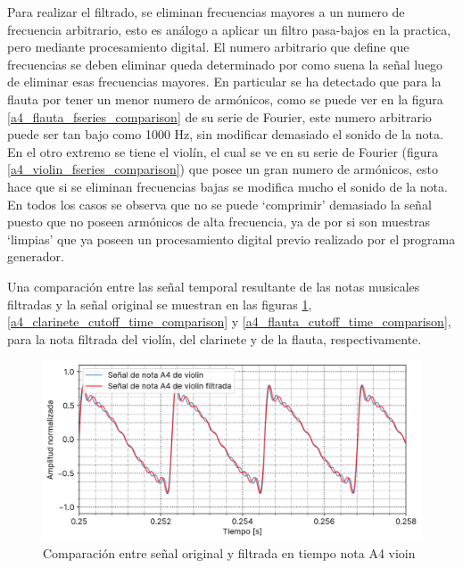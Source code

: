 \documentclass[12pt]{article}
\begin{document}
Para realizar el filtrado, se eliminan frecuencias mayores a un numero de frecuencia arbitrario, esto es análogo a aplicar un filtro pasa-bajos en la practica, pero mediante procesamiento digital. El numero arbitrario que define que frecuencias se deben eliminar queda determinado por como suena la señal luego de eliminar esas frecuencias mayores. En particular se ha detectado que para la flauta por tener un menor numero de armónicos, como se puede ver en la figura \ref{a4_flauta_fseries_comparison} de su serie de Fourier, este numero arbitrario puede ser tan bajo como 1000 Hz, sin modificar demasiado el sonido de la nota. En el otro extremo se tiene el violín, el cual se ve en su serie de Fourier (figura \ref{a4_violin_fseries_comparison}) que posee un gran numero de armónicos, esto hace que si se eliminan frecuencias bajas se modifica mucho el sonido de la nota. En todos los casos se observa que no se puede `comprimir' demasiado la señal puesto que no poseen armónicos de alta frecuencia, ya de por si son muestras `limpias' que ya poseen un procesamiento digital previo realizado por el programa generador.

Una comparación entre las señal temporal resultante de las notas musicales filtradas y la señal original se muestran en las figuras \ref{a4_violin_cutoff_time_comparison}, \ref{a4_clarinete_cutoff_time_comparison} y \ref{a4_flauta_cutoff_time_comparison}, para la nota filtrada del violín, del clarinete y de la flauta, respectivamente.

\begin{figure}[H]
\centering
\includegraphics{plot/a4_violin_cutoff_time_comparison.png}
\caption{Comparación entre señal original y filtrada en tiempo nota A4 vioin}
\label{a4_violin_cutoff_time_comparison}
\end{figure}
\end{document}
